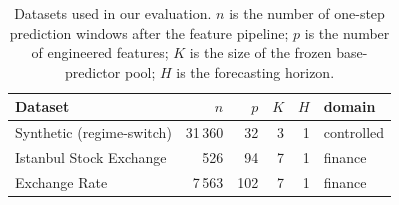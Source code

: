 \begin{table}[t]
\centering
\caption{Datasets used in our evaluation. $n$ is the number of one-step prediction windows after the feature pipeline; $p$ is the number of engineered features; $K$ is the size of the frozen base-predictor pool; $H$ is the forecasting horizon.}
\label{tab:datasets}
\small
\begin{tabular}{lrrrrl}
\toprule
Dataset & $n$ & $p$ & $K$ & $H$ & domain \\
\midrule
Synthetic (regime-switch) & 31\,360 & 32 & 3 & 1 & controlled \\
Istanbul Stock Exchange & 526 & 94 & 7 & 1 & finance \\
Exchange Rate & 7\,563 & 102 & 7 & 1 & finance \\
\bottomrule
\end{tabular}
\end{table}
